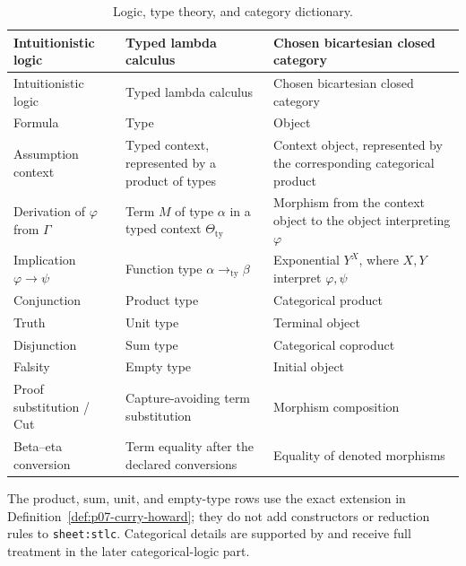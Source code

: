 \begingroup\small
\begin{longtable}{@{}p{}p{}p{}@{}}
\caption{Logic, type theory, and category dictionary.}
\label{tab:p07-curry-howard}\\
\toprule
Intuitionistic logic & Typed lambda calculus & Chosen bicartesian closed
category \\
\midrule
\endfirsthead
\toprule
Intuitionistic logic & Typed lambda calculus & Chosen bicartesian closed
category \\
\midrule
\endhead
Formula & Type & Object \\
Assumption context & Typed context, represented by a product of types &
Context object, represented by the corresponding categorical product \\
Derivation of \(\varphi\) from \(\Gamma\) & Term \(M\) of type \(\alpha\)
in a typed context \(\Theta_{\mathrm{ty}}\) & Morphism from the context object
to the object interpreting \(\varphi\) \\
Implication \(\varphi\to\psi\) & Function type
\(\alpha\mathbin{\to_{\mathrm{ty}}}\beta\) & Exponential \(Y^X\), where
\(X,Y\) interpret \(\varphi,\psi\) \\
Conjunction & Product type & Categorical product \\
Truth & Unit type & Terminal object \\
Disjunction & Sum type & Categorical coproduct \\
Falsity & Empty type & Initial object \\
Proof substitution / Cut & Capture-avoiding term substitution & Morphism
composition \\
Beta--eta conversion & Term equality after the declared conversions &
Equality of denoted morphisms \\
\bottomrule
\end{longtable}
\endgroup

The product, sum, unit, and empty-type rows use the exact extension in
Definition~\ref{def:p07-curry-howard}; they do not add constructors or
reduction rules to \texttt{sheet:stlc}.  Categorical details are supported by
\cite{GirardLafontTaylor1989,LambekScott1986} and receive full treatment in
the later categorical-logic part.

